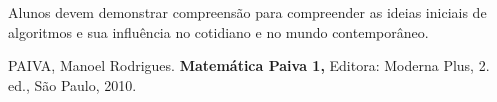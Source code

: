 \documentclass[oneside,a4paper,12pt]{article}
\begin{document}
  Alunos devem demonstrar compreensão para compreender as ideias iniciais de algoritmos e sua influência no cotidiano e no mundo
  contemporâneo.




\begin{thebibliography}{}

PAIVA, Manoel Rodrigues.
\newblock \textbf{Matemática Paiva 1,}
\newblock Editora: Moderna Plus, 2. ed., São Paulo, 2010.

\end{thebibliography}
\end{document}
